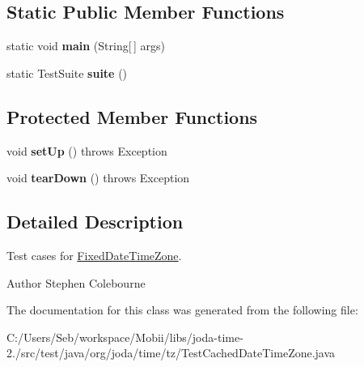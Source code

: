 \subsection*{Static Public Member Functions}
\begin{DoxyCompactItemize}
\item 
\hypertarget{classorg_1_1joda_1_1time_1_1tz_1_1_test_cached_date_time_zone_abfb27d60e4f7a84124226287ba0a87cf}{static void {\bfseries main} (String\mbox{[}$\,$\mbox{]} args)}\label{classorg_1_1joda_1_1time_1_1tz_1_1_test_cached_date_time_zone_abfb27d60e4f7a84124226287ba0a87cf}

\item 
\hypertarget{classorg_1_1joda_1_1time_1_1tz_1_1_test_cached_date_time_zone_acef8a646e54799215d74a26e7c16e91d}{static Test\-Suite {\bfseries suite} ()}\label{classorg_1_1joda_1_1time_1_1tz_1_1_test_cached_date_time_zone_acef8a646e54799215d74a26e7c16e91d}

\end{DoxyCompactItemize}
\subsection*{Protected Member Functions}
\begin{DoxyCompactItemize}
\item 
\hypertarget{classorg_1_1joda_1_1time_1_1tz_1_1_test_cached_date_time_zone_a5ea55cb16cbce2439a327899664ed5bc}{void {\bfseries set\-Up} ()  throws Exception }\label{classorg_1_1joda_1_1time_1_1tz_1_1_test_cached_date_time_zone_a5ea55cb16cbce2439a327899664ed5bc}

\item 
\hypertarget{classorg_1_1joda_1_1time_1_1tz_1_1_test_cached_date_time_zone_a8d4295525fc35e6c14e0ca51419d25c2}{void {\bfseries tear\-Down} ()  throws Exception }\label{classorg_1_1joda_1_1time_1_1tz_1_1_test_cached_date_time_zone_a8d4295525fc35e6c14e0ca51419d25c2}

\end{DoxyCompactItemize}


\subsection{Detailed Description}
Test cases for \hyperlink{classorg_1_1joda_1_1time_1_1tz_1_1_fixed_date_time_zone}{Fixed\-Date\-Time\-Zone}.

\begin{DoxyAuthor}{Author}
Stephen Colebourne 
\end{DoxyAuthor}


The documentation for this class was generated from the following file\-:\begin{DoxyCompactItemize}
\item 
C\-:/\-Users/\-Seb/workspace/\-Mobii/libs/joda-\/time-\/2./src/test/java/org/joda/time/tz/Test\-Cached\-Date\-Time\-Zone.\-java\end{DoxyCompactItemize}
